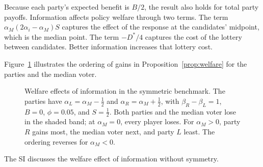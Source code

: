 \documentclass[12pt,letterpaper]{article}
\begin{document}
Because each party's expected benefit is $B/2$, the result also holds for total party payoffs. Information affects policy welfare through two terms. The term $\alpha_M(2\alpha_i-\alpha_M)S$ captures the effect of the response at the candidates' midpoint, which is the median point. The term $-D^*/4$ captures the cost of the lottery between candidates. Better information increases that lottery cost.

Figure~\ref{fig:welfare} illustrates the ordering of gains in Proposition~\ref{prop:welfare} for the parties and the median voter.

\begin{figure}[t]
\centering
{}
\caption{Welfare effects of information in the symmetric benchmark. The parties have $\alpha_L=\alpha_M-\tfrac12$ and $\alpha_R=\alpha_M+\tfrac12$, with $\beta_R-\beta_L=1$, $B=0$, $\phi=0.05$, and $S=\tfrac12$. Both parties and the median voter lose in the shaded band; at $\alpha_M=0$, every player loses. For $\alpha_M>0$, party $R$ gains most, the median voter next, and party $L$ least. The ordering reverses for $\alpha_M<0$.}
\label{fig:welfare}
\end{figure}

The SI discusses the welfare effect of information without symmetry.
\end{document}
